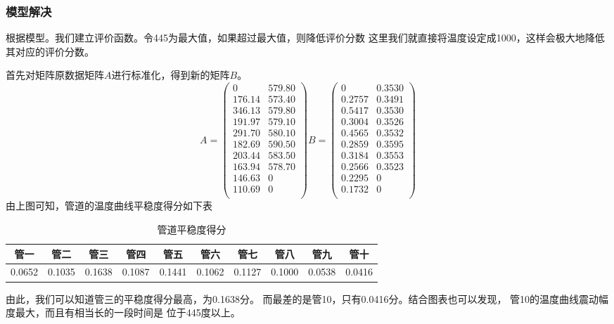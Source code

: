         \subsubsection{模型解决}
            根据模型。我们建立评价函数。令445为最大值，如果超过最大值，则降低评价分数
            这里我们就直接将温度设定成1000，这样会极大地降低其对应的评价分数。\par
            首先对矩阵原数据矩阵$A$进行标准化，得到新的矩阵$B$。
            \begin{equation}
                A=\begin{pmatrix}
                    0& 579.80\\
                    176.14&	573.40\\
                    346.13&	579.80\\
                    191.97&	579.10\\
                    291.70&	580.10\\
                    182.69&	590.50\\
                    203.44&	583.50\\
                    163.94&	578.70\\
                    146.63&	0\\
                    110.69&	0\\
                \end{pmatrix}
                B=\begin{pmatrix}
                    0	  &  0.3530\\
                    0.2757&	0.3491\\
                    0.5417&	0.3530\\
                    0.3004&	0.3526\\
                    0.4565&	0.3532\\
                    0.2859&	0.3595\\
                    0.3184& 0.3553\\
                    0.2566&	0.3523\\
                    0.2295&	0\\
                    0.1732&	0\\
                \end{pmatrix}
            \end{equation}
            由上图可知，管道的温度曲线平稳度得分如下表
            \begin{table}[H]
                \begin{tabular}{|c|c|c|c|c|c|c|c|c|c|}
                    \hline
                    管一&管二&管三&管四&管五&管六&管七&管八&管九&管十\\
                    \hline
                    0.0652 &0.1035 &0.1638 &0.1087&0.1441
                    &0.1062&0.1127&0.1000&0.0538&0.0416\\
                    \hline
                \end{tabular}
                \caption{管道平稳度得分}
            \end{table}
            由此，我们可以知道管三的平稳度得分最高，为0.1638分。
            而最差的是管10，只有0.0416分。结合图表也可以发现，
            管10的温度曲线震动幅度最大，而且有相当长的一段时间是
            位于445度以上。
